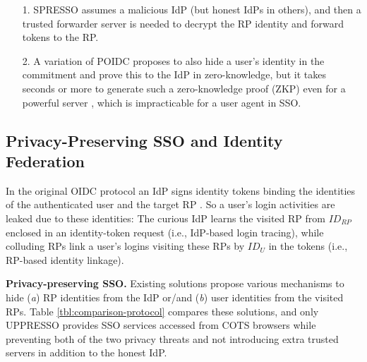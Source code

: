 \begin{table*}[tb]
{\begin{itemize}
\item[1.]
SPRESSO assumes a malicious IdP (but honest IdPs in others), and then a trusted forwarder server is needed to decrypt the RP identity and forward tokens to the RP.

\item[2.]
A variation of POIDC \cite{POIDC} proposes to also hide a user's identity in the commitment and prove this to the IdP in zero-knowledge,
        but it takes seconds or more to generate such a zero-knowledge proof (ZKP) even for a powerful server \cite{ZKP-BINF,zkp-benchmark,ZKP-GPU},
        which is impracticable for a user agent in SSO.
%
\end{itemize}}
\end{table*}

\subsection{Privacy-Preserving SSO and Identity Federation}
\label{subsec-solutions}
In the original OIDC protocol 
    an IdP signs identity tokens binding the identities of the authenticated user and the target RP \cite{OpenIDConnect,rfc6749}.
So
    a user's login activities are leaked due to these identities:
        The curious IdP learns the visited RP from $ID_{RP}$ enclosed in an identity-token request (i.e., IdP-based login tracing),
        while colluding RPs link a user's logins visiting these RPs by $ID_{U}$ in the tokens (i.e., RP-based identity linkage).




\noindent\textbf{Privacy-preserving SSO.}
Existing solutions propose various mechanisms to hide (\emph{a}) RP identities from the IdP or/and (\emph{b}) user identities from the visited RPs.
Table \ref{tbl:comparison-protocol} compares these solutions,
and only UPPRESSO provides SSO services accessed from COTS browsers while preventing both of the two privacy threats and not introducing extra trusted servers in addition to the honest IdP.


